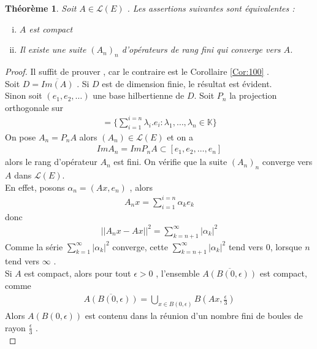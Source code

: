 \documentclass{report}
\newtheorem{The}{Théorème}[subsection]
\begin{document}
{\begin{The} Soit $A \in \mathscr{L}(E)$ . Les assertions suivantes sont équivalentes : 


	\begin{enumerate}[i)]
	\item 	$A$ est compact \\
	\item Il existe une suite $(A_n)_n$ d'opérateurs de rang fini qui converge vers $A$.\\
	\end{enumerate}
\end{The}
\begin{proof}
Il suffit de prouver  , car le contraire est le Corollaire \ref{Cor:100} . \\
Soit $D = \overline{Im(A)}$ . Si $D$ est de dimension finie, le résultat est évident.\\
Sinon soit $(e_1, e_2, \ldots)$ une base hilbertienne de $D$. Soit $P_n$ la projection orthogonale sur 
					\begin{align*}
					 [e_1, \ldots, e_n] = \{\sum_{i=1}^{i=n} \lambda_i.e_i : \lambda_1, \ldots, \lambda_n \in \mathbb{K}\} 
					\end{align*}
On pose $A_n = P_n A$ alors $(A_n) \in \mathscr{L}(E)$ et on a 
					\begin{align*}
					 Im A_n = Im P_n A \subset [e_1, e_2, \ldots, e_n] 
					\end{align*}
alors le rang d'opérateur $A_n$ est fini. On vérifie que la suite $(A_n)_n$ converge vers $A$ dans $\mathscr{L}(E)$.\\
En effet, posons $\alpha_n = (Ax, e_n)$ , alors 
					\begin{align*}
					 A_n x = \sum_{i=1}^{i=n} \alpha_k e_k 
					\end{align*}
donc 
					\begin{align*}
					 ||A_nx - Ax||^2 = \sum_{k=n+1}^{\infty} |\alpha_k|^2 
					\end{align*}
Comme la série $\sum_{k=1}^{\infty} |\alpha_k|^2$ converge, cette $\sum_{k=n+1}^{\infty} |\alpha_k|^2$ tend vers $0$, lorsque $n$ tend vers $\infty$ .\\
Si $A$ est compact, alors pour tout $\epsilon > 0$ , l'ensemble $\overline{A(B(0,\epsilon))}$ est compact, comme 
					\begin{align*}
					 \overline{A(B(0,\epsilon))} = \bigcup_{x\in B(0,\epsilon)} B(Ax, \frac{\epsilon}{3}) 
					\end{align*}
Alors $A(B(0,\epsilon))$ est contenu dans la réunion d'un nombre fini de boules de rayon $\frac{\epsilon}{3}$ .\\

\end{proof}}
\end{document}
